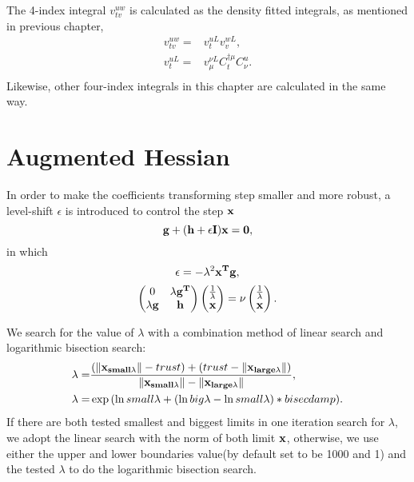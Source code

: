 \documentclass[a4paper,12pt,oneside]{book}
\begin{document}
The 4-index integral $v^{uw}_{tv}$ is calculated as the density fitted integrals, as mentioned in previous chapter,
\begin{equation}
\begin{aligned}
  v^{uw}_{tv} =& v^{uL}_t v^{wL}_v,\\
  v^{uL}_t =& v^{\nu L}_{\mu} C_t^{\dagger \mu} C^u_{\nu}.\\
\end{aligned}
\end{equation}
Likewise, other four-index integrals in this chapter are calculated in the same way.


\section{Augmented Hessian}
In order to make the coefficients transforming step smaller and more robust, 
a level-shift $\epsilon$ is introduced to control the step $\bf{x}$ \cite{augmentedHessian1981}
\begin{equation}
\bf{g}+(\bf{h}+\epsilon \bf{I})\bf{x}=0,
\end{equation}
in which
\begin{equation}
\epsilon =-\lambda^2\bf{x}^T\bf{g},
\end{equation}
\begin{equation}
\begin{pmatrix}
    0 & \lambda \bf{g}^T \\
    \lambda \bf{g} & \bf{h}
\end{pmatrix}
\begin{pmatrix}
    \frac{1}{\lambda} \\
    \bf{x}
\end{pmatrix}
= \nu
\begin{pmatrix}
    \frac{1}{\lambda} \\
    \bf{x}
\end{pmatrix}.
\end{equation}

We search for the value of $\lambda$ with a combination method of linear search and logarithmic bisection search:
\begin{equation}
\begin{aligned}
  \lambda =&\frac{(\left\lVert\bf{x_{small\lambda}}\right\rVert - trust) + (trust -\left\lVert\bf{x_{large\lambda}}\right\rVert)}{\left\lVert\bf{x_{small\lambda}}\right\rVert-\left\lVert\bf{x_{large\lambda}}\right\rVert},\\
  \lambda=&\exp{(\ln{small\lambda}+(\ln{big\lambda}-\ln{small\lambda}) * bisecdamp)}.
\end{aligned}
\end{equation}
If there are both tested smallest and biggest limits in one iteration search for $\lambda$, we adopt the linear search with the norm of both limit $\bf{x}$,
otherwise, we use either the upper and lower boundaries value(by default set to be 1000 and 1) and the tested $\lambda$ to do the logarithmic bisection search.
\end{document}
